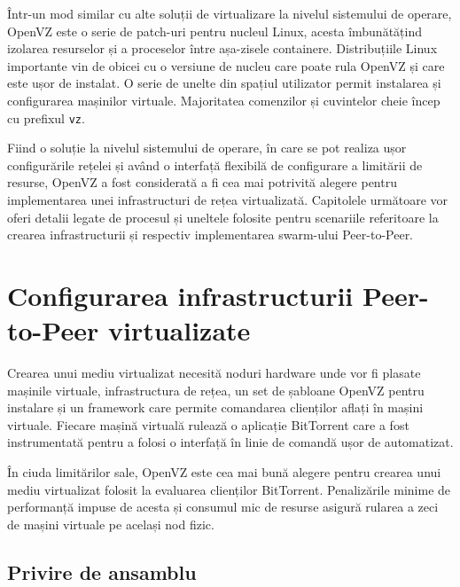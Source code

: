 Într-un mod similar cu alte soluții de virtualizare la nivelul sistemului
de operare, OpenVZ este o serie de patch-uri pentru nucleul Linux,
acesta îmbunătățind izolarea resurselor și a proceselor între așa-zisele
containere. Distribuțiile Linux importante vin de obicei cu o versiune
de nucleu care poate rula OpenVZ și care este ușor de instalat. O
serie de unelte din spațiul utilizator permit instalarea și configurarea
mașinilor virtuale. Majoritatea comenzilor și cuvintelor cheie încep cu
prefixul \texttt{vz}.

Fiind o soluție la nivelul sistemului de operare, în care se pot realiza
ușor configurările rețelei și având o interfață flexibilă de configurare
a limitării de resurse, OpenVZ a fost considerată a fi cea mai potrivită
alegere pentru implementarea unei infrastructuri de rețea virtualizată.
Capitolele următoare vor oferi detalii legate de procesul și uneltele
folosite pentru scenariile referitoare la crearea infrastructurii și
respectiv implementarea swarm-ului Peer-to-Peer.

\section{Configurarea infrastructurii Peer-to-Peer virtualizate}
\label{sec:virt-infra:setup}

Crearea unui mediu virtualizat necesită noduri hardware unde vor fi
plasate mașinile virtuale, infrastructura de rețea, un set de șabloane
OpenVZ pentru instalare și un framework care permite comandarea clienților
aflați în mașini virtuale. Fiecare mașină virtuală rulează o aplicație
BitTorrent care a fost instrumentată pentru a folosi o interfață în linie
de comandă ușor de automatizat.

În ciuda limitărilor sale, OpenVZ este cea mai bună alegere pentru crearea
unui mediu virtualizat folosit la evaluarea clienților BitTorrent. 
Penalizările minime de performanță impuse de acesta și consumul mic de 
resurse asigură rularea a zeci de mașini virtuale pe același nod fizic.

\subsection{Privire de ansamblu}
\label{sec:virt-overall}


